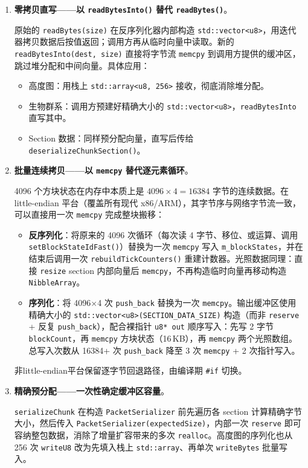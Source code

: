 \begin{enumerate}
    \item \textbf{零拷贝直写——以 \texttt{readBytesInto()} 替代 \texttt{readBytes()}}。

    原始的 \texttt{readBytes(size)} 在反序列化器内部构造 \texttt{std::vector<u8>}，用迭代器拷贝数据后按值返回；调用方再从临时向量中读取。新的 \texttt{readBytesInto(dest, size)} 直接将字节流 \texttt{memcpy} 到调用方提供的缓冲区，跳过堆分配和中间向量。具体应用：

    \begin{itemize}
        \item 高度图：用栈上 \texttt{std::array<u8, 256>} 接收，彻底消除堆分配。
        \item 生物群系：调用方预建好精确大小的 \texttt{std::vector<u8>}，\texttt{readBytesInto} 直写其中。
        \item Section 数据：同样预分配向量，直写后传给 \texttt{deserializeChunkSection()}。
    \end{itemize}

    \item \textbf{批量连续拷贝——以 \texttt{memcpy} 替代逐元素循环}。

    4096 个方块状态在内存中本质上是 $4096 \times 4 = 16384$ 字节的连续数据。在 little-endian 平台（覆盖所有现代 x86/ARM），其字节序与网络字节流一致，可以直接用一次 \texttt{memcpy} 完成整块搬移：

    \begin{itemize}
        \item \textbf{反序列化}：将原来的 4096 次循环（每次读 4 字节、移位、或运算、调用 \texttt{setBlockStateIdFast()}）替换为一次 \texttt{memcpy} 写入 \texttt{m\_blockStates}，并在结束后调用一次 \texttt{rebuildTickCounters()} 重建计数器。光照数据同理：直接 \texttt{resize} section 内部向量后 \texttt{memcpy}，不再构造临时向量再移动构造 \texttt{NibbleArray}。
        \item \textbf{序列化}：将 4096$\times$4 次 \texttt{push\_back} 替换为一次 \texttt{memcpy}。输出缓冲区使用精确大小的 \texttt{std::vector<u8>(SECTION\_DATA\_SIZE)} 构造（而非 \texttt{reserve} + 反复 \texttt{push\_back}），配合裸指针 \texttt{u8* out} 顺序写入：先写 2 字节 \texttt{blockCount}，再 \texttt{memcpy} 方块状态（16\,KB），再 \texttt{memcpy} 两个光照数组。总写入次数从 16384+ 次 \texttt{push\_back} 降至 3 次 \texttt{memcpy} + 2 次指针写入。
    \end{itemize}

    非little-endian平台保留逐字节回退路径，由编译期 \texttt{\#if} 切换。

    \item \textbf{精确预分配——一次性确定缓冲区容量}。

    \texttt{serializeChunk} 在构造 \texttt{PacketSerializer} 前先遍历各 section 计算精确字节大小，然后传入 \texttt{PacketSerializer(expectedSize)}，内部一次 \texttt{reserve} 即可容纳整包数据，消除了增量扩容带来的多次 \texttt{realloc}。高度图的序列化也从 256 次 \texttt{writeU8} 改为先填入栈上 \texttt{std::array}、再单次 \texttt{writeBytes} 批量写入。
\end{enumerate}

